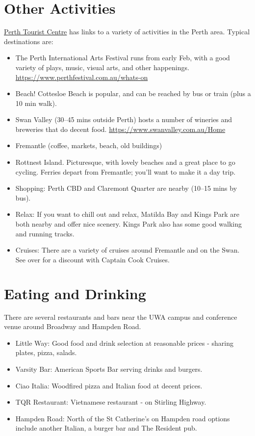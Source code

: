 \documentclass[]{article}
\providecommand{\tightlist}{%
  \setlength{\itemsep}{0pt}\setlength{\parskip}{0pt}}
\begin{document}
\section{Other Activities}\label{other-activities}

\href{http://perthtouristcentre.com.au}{Perth Tourist Centre} has links
to a variety of activities in the Perth area. Typical destinations are:

\begin{itemize}
\tightlist
\item
  The Perth International Arts Festival runs from early Feb, with a good
  variety of plays, music, visual arts, and other happenings.
  \url{https://www.perthfestival.com.au/whats-on}
\item
  Beach! Cottesloe Beach is popular, and can be reached by bus or train
  (plus a 10 min walk).
\item
  Swan Valley (30--45 mins outside Perth) hosts a number of wineries and
  breweries that do decent food.
  \url{https://www.swanvalley.com.au/Home}
\item
  Fremantle (coffee, markets, beach, old buildings)
\item
  Rottnest Island. Picturesque, with lovely beaches and a great place to
  go cycling. Ferries depart from Fremantle; you'll want to make it a
  day trip.
\item
  Shopping: Perth CBD and Claremont Quarter are nearby (10--15 mins by
  bus).
\item
  Relax: If you want to chill out and relax, Matilda Bay and Kings Park
  are both nearby and offer nice scenery. Kings Park also has some good
  walking and running tracks.
\item
  Cruises: There are a variety of cruises around Fremantle and on the
  Swan. See over for a discount with Captain Cook Cruises.
\end{itemize}

\section{Eating and Drinking}\label{eating-and-drinking}

There are several restaurants and bars near the UWA campus and
conference venue around Broadway and Hampden Road.

\begin{itemize}
\tightlist
\item
  Little Way: Good food and drink selection at reasonable prices -
  sharing plates, pizza, salads.
\item
  Varsity Bar: American Sports Bar serving drinks and burgers.
\item
  Ciao Italia: Woodfired pizza and Italian food at decent prices.
\item
  TQR Restaurant: Vietnamese restaurant - on Stirling Highway.
\item
  Hampden Road: North of the St Catherine's on Hampden road options
  include another Italian, a burger bar and The Resident pub.
\end{itemize}
\end{document}
